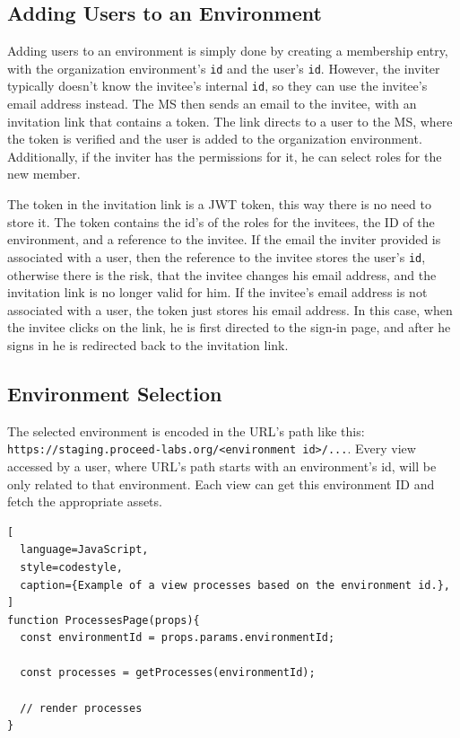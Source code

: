 \subsection{Adding Users to an Environment}

Adding users to an environment is simply done by creating a membership entry, with the
organization environment's \lstinline{id} and the user's \lstinline{id}.
However, the inviter typically doesn't know the invitee's internal \lstinline{id},
so they can use the invitee's email address instead.
The MS then sends an email to the invitee, with an invitation link that contains a token.
The link directs to a user to the MS, where the token is verified and the user is added to
the organization environment.
Additionally, if the inviter has the permissions for it, he can select roles for the new member.

The token in the invitation link is a JWT token, this way there is no need to store it.
The token contains the id's of the roles for
the invitees, the ID of the environment, and a reference to the invitee.
If the email the inviter provided is associated with a user, then the reference to the
invitee stores the user's \lstinline{id}, otherwise there is the risk, that the invitee
changes his email address, and the invitation link is no longer valid for him.
If the invitee's email address is not associated with a user, the token just stores his
email address.
In this case, when the invitee clicks on the link, he is first directed to the sign-in
page, and after he signs in he is redirected back to the invitation link.


\subsection{Environment Selection}


The selected environment is encoded in the URL's path like this:
\lstinline{https://staging.proceed-labs.org/<environment id>/...}.
Every view accessed by a user, where URL's path starts with an environment's id, will be
only related to that environment.
Each view can get this environment ID and fetch the appropriate assets.

\begin{lstlisting}[
  language=JavaScript,
  style=codestyle,
  caption={Example of a view processes based on the environment id.},
]
function ProcessesPage(props){
  const environmentId = props.params.environmentId; 

  const processes = getProcesses(environmentId);

  // render processes
}
\end{lstlisting}

